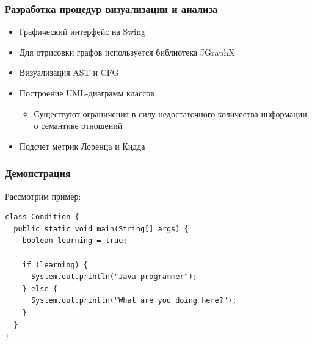 \documentclass{beamer}
\begin{document}
\begin{frame}
\frametitle{Разработка процедур визуализации и анализа}

\begin{itemize}
    \item Графический интерфейс на Swing
    \item Для отрисовки графов используется библиотека JGraphX
    \item Визуализация AST и CFG
    \item Построение UML-диаграмм классов
        \begin{itemize}
            \item Существуют ограничения в силу недостаточного количества
            информации о семантике отношений
        \end{itemize}
    \item Подсчет метрик Лоренца и Кидда
\end{itemize}

\end{frame}
\begin{frame}[fragile]
\frametitle{Демонстрация}

Рассмотрим пример:

\begin{lstlisting}
class Condition {
  public static void main(String[] args) {
    boolean learning = true;

    if (learning) {
      System.out.println("Java programmer");
    } else {
      System.out.println("What are you doing here?");
    }
  }
}
\end{lstlisting}

\end{frame}
\end{document}
